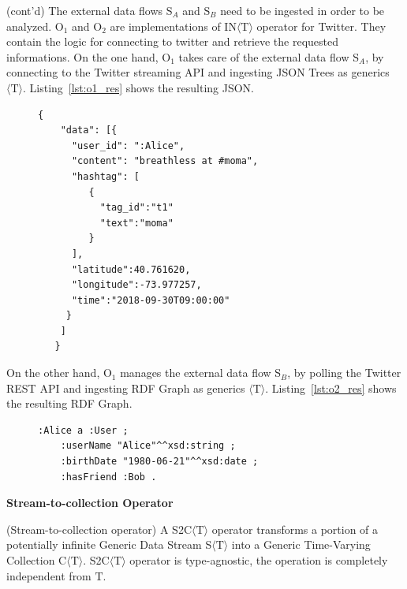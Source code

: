 \begin{Example}
(cont'd) The external data flows S$_A$ and S$_B$ need to be ingested in order to be analyzed.
O$_1$ and O$_2$ are implementations of IN$\langle\mathrm{T}\rangle$ operator for Twitter. 
They contain the logic for connecting to twitter and retrieve the requested informations.
On the one hand, O$_1$ takes care of the external data flow S$_A$, by connecting to the Twitter streaming API and ingesting JSON Trees as generics $\langle\mathrm{T}\rangle$.
Listing~\ref{lst:o1_res} shows the resulting JSON.

\begin{figure}[ht]
\begin{minipage}{0.95\linewidth}
\begin{lstlisting}[caption={Example of the data resulting by the ingestion operation performed by O$_1$.},label=lst:o1_res,style=JSON]
  {
    "data": [{
      "user_id": ":Alice",
      "content": "breathless at #moma",
      "hashtag": [
         { 
           "tag_id":"t1"
           "text":"moma"
         }
      ],
      "latitude":40.761620,
      "longitude":-73.977257,
      "time":"2018-09-30T09:00:00"
     }
    ]
   }
\end{lstlisting}
\end{minipage}
\end{figure}

On the other hand, O$_1$ manages the external data flow S$_B$, by polling the Twitter REST API and ingesting RDF Graph as generics $\langle\mathrm{T}\rangle$.
Listing~\ref{lst:o2_res} shows the resulting RDF Graph.

\begin{figure}[ht]
\begin{minipage}{0.95\linewidth}
\begin{lstlisting}[caption={Example of the data resulting by the ingestion operation performed by O$_2$.},label=lst:o2_res,style=N3]
:Alice a :User ;
    :userName "Alice"^^xsd:string ;
    :birthDate "1980-06-21"^^xsd:date ;
    :hasFriend :Bob .
\end{lstlisting}
\end{minipage}
\end{figure}

\end{Example}

\pagebreak

\medskip
\noindent
\textbf{Stream-to-collection Operator}
\medskip

\begin{Definition}
(Stream-to-collection operator) A S2C$\langle\mathrm{T}\rangle$ operator transforms a portion of a potentially infinite Generic Data Stream S$\langle\mathrm{T}\rangle$ into a Generic Time-Varying Collection C$\langle\mathrm{T}\rangle$.
S2C$\langle\mathrm{T}\rangle$ operator is type-agnostic, the operation is completely independent from $\mathrm{T}$.
\end{Definition}

